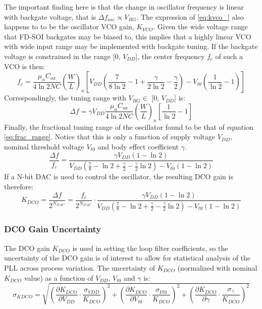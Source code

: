 		The important finding here is that the change in oscillator frequency is linear with backgate voltage, that is $\Delta f_{osc} \propto V_{BG}$. The expression of \ref{eq:kvco_} also happens to to be the oscillator VCO gain, $K_{VCO}$. Given the wide voltage range that FD-SOI backgates may be biased to, this implies that a highly linear VCO with wide input range may be implemented with backgate tuning. If the backgate voltage is constrained in the range [0, $V_{DD}$], the center frequency $f_c$ of such a VCO is then:
		\begin{equation}
			f_{c} = \frac{\mu_nC_{ox}}{4\ln2NC}\left(\frac{W}{L}\right)_n\left[V_{DD}\left(\frac{7}{8\ln2}-1+\frac{\gamma}{2\ln2}-\frac{\gamma}{2}\right)-V_{t0}\left(\frac{1}{\ln2}-1\right)\right]
		\end{equation}
		Correspondingly, the tuning range with $V_{BG} \in$ [0, $V_{DD}$] is:
		\begin{equation}\label{eq:tuning_range}
			\Delta f = \gamma V_{DD}\frac{\mu_nC_{ox}}{4\ln2NC}\left(\frac{W}{L}\right)_n\left[\frac{1}{\ln2}-1\right]
		\end{equation}
		Finally, the fractional tuning range of the oscillator found to be that of equation \ref{eq:frac_range}. Notice that this is only a function of supply voltage $V_{DD}$, nominal threshold voltage $V_{t0}$ and body effect coefficient $\gamma$.
		\begin{equation}\label{eq:frac_range}
			\frac{\Delta f}{f_c} = \frac{\gamma V_{DD}\left( 1-\ln2 \right)}{V_{DD}\left(\frac{7}{8}-\ln2+\frac{\gamma}{2}-\frac{\gamma}{2}\ln2\right)-V_{t0}\left(1-\ln2\right)}
		\end{equation}	
		If a N-bit DAC is used to control the oscillator, the resulting DCO gain is therefore:
		\begin{equation}
			K_{DCO} = \frac{\Delta f}{2^{N_{DAC}}} = \frac{f_c}{2^{N_{DAC}}}\cdot\frac{\gamma V_{DD}\left( 1-\ln2 \right)}{V_{DD}\left(\frac{7}{8}-\ln2+\frac{\gamma}{2}-\frac{\gamma}{2}\ln2\right)-V_{t0}\left(1-\ln2\right)}
		\end{equation}	
	\subsubsection{DCO Gain Uncertainty}
		The DCO gain $K_{DCO}$ is used in setting the loop filter coefficients, so the uncertainty of the DCO gain is of interest to allow for statistical analysis of the PLL across process variation. The uncertainty of $K_{DCO}$ (normalized with nominal $K_{DCO}$ value) as a function of $V_{DD}$, $V_{t0}$ and $\gamma$ is:
		\begin{equation}
			\sigma_{KDCO} = \sqrt{\left(\frac{\partial K_{DCO}}{\partial V_{DD}}\cdot\frac{\sigma_{VDD}}{K_{DCO}} \right)^2 + \left(\frac{\partial K_{DCO}}{\partial V_{t0}}\cdot\frac{\sigma_{Vt0}}{K_{DCO}} \right)^2 + \left(\frac{\partial K_{DCO}}{\partial \gamma}\cdot\frac{\sigma_\gamma}{K_{DCO}} \right)^2}
		\end{equation}

